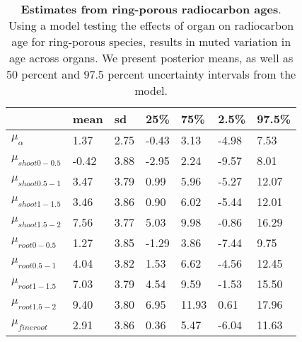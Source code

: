\documentclass{article}\usepackage[]{graphicx}\usepackage[]{color}
\begin{document}
\begin{table}[ht]
\centering
\caption{\textbf{Estimates from ring-porous radiocarbon ages}. Using a model testing the effects of organ on radiocarbon age for ring-porous species, results in muted variation in age across organs. We present posterior means, as well as 50 percent and 97.5 percent uncertainty intervals from the model.} 
\label{tab:ringradio}
\begingroup\footnotesize
\begin{tabular}{|p{}|p{}|p{}|p{}|p{}|p{}|p{}|}
  \hline
 & mean & sd & 25\% & 75\% & 2.5\% & 97.5\% \\ 
  \hline
$\mu_{\alpha}$ & 1.37 & 2.75 & -0.43 & 3.13 & -4.98 & 7.53 \\ 
  $\mu_{shoot 0-0.5}$ & -0.42 & 3.88 & -2.95 & 2.24 & -9.57 & 8.01 \\ 
  $\mu_{shoot 0.5-1}$ & 3.47 & 3.79 & 0.99 & 5.96 & -5.27 & 12.07 \\ 
  $\mu_{shoot 1-1.5}$ & 3.46 & 3.86 & 0.90 & 6.02 & -5.44 & 12.01 \\ 
  $\mu_{shoot 1.5-2}$ & 7.56 & 3.77 & 5.03 & 9.98 & -0.86 & 16.29 \\ 
  $\mu_{root 0-0.5}$ & 1.27 & 3.85 & -1.29 & 3.86 & -7.44 & 9.75 \\ 
  $\mu_{root 0.5-1}$ & 4.04 & 3.82 & 1.53 & 6.62 & -4.56 & 12.45 \\ 
  $\mu_{root 1-1.5}$ & 7.03 & 3.79 & 4.54 & 9.59 & -1.53 & 15.50 \\ 
  $\mu_{root 1.5-2}$ & 9.40 & 3.80 & 6.95 & 11.93 & 0.61 & 17.96 \\ 
  $\mu_{fineroot}$ & 2.91 & 3.86 & 0.36 & 5.47 & -6.04 & 11.63 \\ 
   \hline
\end{tabular}
\endgroup
\end{table}
\end{document}
